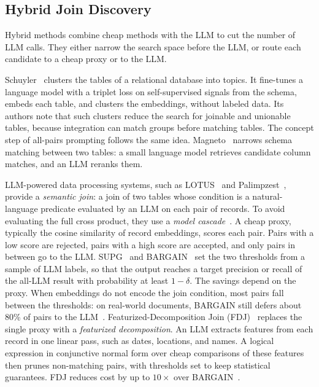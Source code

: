 \subsection{Hybrid Join Discovery}
\label{sec:bg_hybrid}
Hybrid methods combine cheap methods with the LLM to cut the number of LLM calls.
They either narrow the search space before the LLM, or route each candidate to a cheap proxy or to the LLM.

 Schuyler~\cite{Schuyler} clusters the tables of a relational database into topics.
It fine-tunes a language model with a triplet loss on self-supervised signals from the schema, embeds each table, and clusters the embeddings, without labeled data.
Its authors note that such clusters reduce the search for joinable and unionable tables, because integration can match groups before matching tables.
The concept step of all-pairs prompting follows the same idea.
Magneto~\cite{Magneto} narrows schema matching between two tables: a small language model retrieves candidate column matches, and an LLM reranks them.

 LLM-powered data processing systems, such as LOTUS~\cite{LOTUS} and Palimpzest~\cite{Palimpzest}, provide a \emph{semantic join}: a join of two tables whose condition is a natural-language predicate evaluated by an LLM on each pair of records.
To avoid evaluating the full cross product, they use a \emph{model cascade}~\cite{FrugalGPT}.
A cheap proxy, typically the cosine similarity of record embeddings, scores each pair.
Pairs with a low score are rejected, pairs with a high score are accepted, and only pairs in between go to the LLM.
SUPG~\cite{SUPG} and BARGAIN~\cite{BARGAIN} set the two thresholds from a sample of LLM labels, so that the output reaches a target precision or recall of the all-LLM result with probability at least $1-\delta$.
The savings depend on the proxy.
When embeddings do not encode the join condition, most pairs fall between the thresholds: on real-world documents, BARGAIN still defers about 80\% of pairs to the LLM~\cite{FDJ}.
Featurized-Decomposition Join (FDJ)~\cite{FDJ} replaces the single proxy with a \emph{featurized decomposition}.
An LLM extracts features from each record in one linear pass, such as dates, locations, and names.
A logical expression in conjunctive normal form over cheap comparisons of these features then prunes non-matching pairs, with thresholds set to keep statistical guarantees.
FDJ reduces cost by up to $10\times$ over BARGAIN~\cite{FDJ}.


